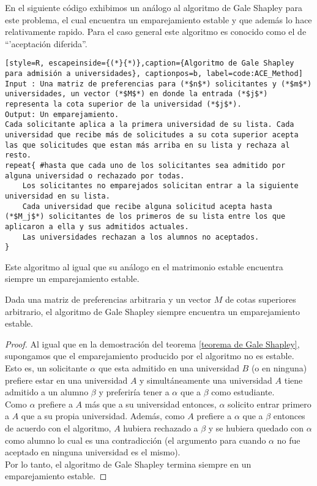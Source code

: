 En el siguiente código exhibimos un análogo al algoritmo de Gale Shapley para este problema, el cual encuentra un emparejamiento estable y que además lo hace relativamente rapido. Para el caso general este algoritmo es conocido como el de ``'aceptación diferida''.
\pagebreak
\begin{lstlisting}[style=R, escapeinside={(*}{*)},caption={Algoritmo de Gale Shapley para admisión a universidades}, captionpos=b, label=code:ACE_Method]
Input : Una matriz de preferencias para (*$n$*) solicitantes y (*$m$*) universidades, un vector (*$M$*) en donde la entrada (*$j$*) representa la cota superior de la universidad (*$j$*).
Output: Un emparejamiento. 
Cada solicitante aplica a la primera universidad de su lista. Cada universidad que recibe más de solicitudes a su cota superior acepta las que solicitudes que estan más arriba en su lista y rechaza al resto. 
repeat{ #hasta que cada uno de los solicitantes sea admitido por alguna universidad o rechazado por todas.
	Los solicitantes no emparejados solicitan entrar a la siguiente universidad en su lista. 
	Cada universidad que recibe alguna solicitud acepta hasta (*$M_j$*) solicitantes de los primeros de su lista entre los que aplicaron a ella y sus admitidos actuales.
	Las universidades rechazan a los alumnos no aceptados.
}
\end{lstlisting}

Este algoritmo al igual que su análogo en el matrimonio estable encuentra siempre un emparejamiento estable.
\begin{cor}
Dada una matriz de preferencias arbitraria y un vector $M$ de cotas superiores arbitrario, el algoritmo de Gale Shapley siempre encuentra un emparejamiento estable.
\end{cor}
\begin{proof}
Al igual que en la demostración del teorema \ref{teorema de Gale Shapley}, supongamos que el emparejamiento producido por el algoritmo no es estable. 
Esto es, un solicitante $\alpha$ que esta admitido en una universidad $B$ (o en ninguna) prefiere estar en una universidad $A$ y simultáneamente una universidad $A$ tiene admitido a un alumno $\beta$ y preferiría tener a $\alpha$ que a $\beta$ como estudiante. \\
Como $\alpha$ prefiere a $A$ más que a su universidad entonces, $\alpha$ solicito entrar primero a $A$ que a su propia universidad. 
Además, como $A$ prefiere a $\alpha$ que a $\beta$ entonces de acuerdo con el algoritmo, $A$ hubiera rechazado a $\beta$ y se hubiera quedado con $\alpha$ como alumno lo cual es una contradicción (el argumento para cuando $\alpha$ no fue aceptado en ninguna universidad es el mismo). \\
Por lo tanto, el algoritmo de Gale Shapley termina siempre en un emparejamiento estable. 
\end{proof}

